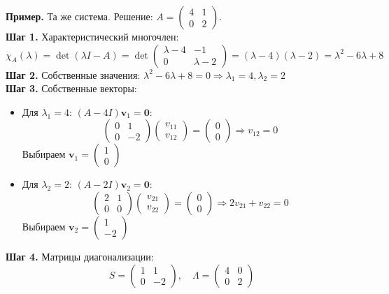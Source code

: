 \textbf{Пример.} Та же система. Решение: \; $A = \begin{pmatrix} 4 & 1 \\ 0 & 2 \end{pmatrix}$.\\
\textbf{Шаг 1.} Характеристический многочлен:
$$\chi_A(\lambda) = \det(\lambda I - A) = \det\begin{pmatrix} \lambda-4 & -1 \\ 0 & \lambda-2 \end{pmatrix} = (\lambda-4)(\lambda-2) = \lambda^2 - 6\lambda + 8$$
\textbf{Шаг 2.} Собственные значения: $\lambda^2 - 6\lambda + 8 = 0 \Rightarrow \lambda_1 = 4, \lambda_2 = 2$\\
\textbf{Шаг 3.} Собственные векторы:
\begin{itemize}
\item Для $\lambda_1 = 4$: $(A - 4I)\mathbf{v}_1 = \mathbf{0}$:
$$\begin{pmatrix} 0 & 1 \\ 0 & -2 \end{pmatrix}\begin{pmatrix} v_{11} \\ v_{12} \end{pmatrix} = \begin{pmatrix} 0 \\ 0 \end{pmatrix} \Rightarrow v_{12} = 0$$
Выбираем $\mathbf{v}_1 = \begin{pmatrix} 1 \\ 0 \end{pmatrix}$
\item Для $\lambda_2 = 2$: $(A - 2I)\mathbf{v}_2 = \mathbf{0}$:
$$\begin{pmatrix} 2 & 1 \\ 0 & 0 \end{pmatrix}\begin{pmatrix} v_{21} \\ v_{22} \end{pmatrix} = \begin{pmatrix} 0 \\ 0 \end{pmatrix} \Rightarrow 2v_{21} + v_{22} = 0$$
Выбираем $\mathbf{v}_2 = \begin{pmatrix} 1 \\ -2 \end{pmatrix}$
\end{itemize}
\textbf{Шаг 4.} Матрицы диагонализации:
$$S = \begin{pmatrix} 1 & 1 \\ 0 & -2 \end{pmatrix}, \quad \Lambda = \begin{pmatrix} 4 & 0 \\ 0 & 2 \end{pmatrix}$$
